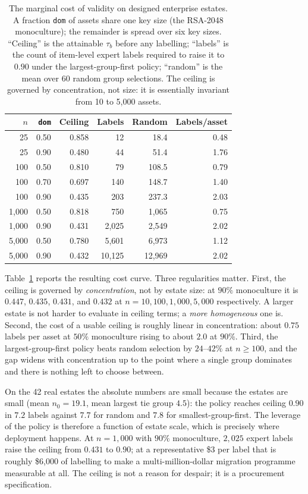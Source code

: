 \documentclass[conference,10pt]{IEEEtran}
\newcommand{\tb}{\tau_b}
\newcommand{\nzero}{n_0}
\begin{document}
\begin{table}[t]
\centering
\caption{The marginal cost of validity on designed enterprise estates. A fraction
\texttt{dom} of assets share one key size (the RSA-2048 monoculture); the remainder is spread over
six key sizes. ``Ceiling'' is the attainable $\tb$ before any labelling; ``labels'' is the count
of item-level expert labels required to raise it to $0.90$ under the largest-group-first policy;
``random'' is the mean over 60 random group selections. The ceiling is governed by concentration,
not size: it is essentially invariant from 10 to 5{,}000 assets.}
\label{tab:labelling}
\small
\begin{tabular}{rrrrrr}
\toprule
$n$ & \texttt{dom} & Ceiling & Labels & Random & Labels/asset \\
\midrule
25  & 0.50 & 0.858 & 12    & 18.4  & 0.48 \\
25  & 0.90 & 0.480 & 44    & 51.4  & 1.76 \\
100 & 0.50 & 0.810 & 79    & 108.5 & 0.79 \\
100 & 0.70 & 0.697 & 140   & 148.7 & 1.40 \\
100 & 0.90 & 0.435 & 203   & 237.3 & 2.03 \\
1{,}000 & 0.50 & 0.818 & 750   & 1{,}065 & 0.75 \\
1{,}000 & 0.90 & 0.431 & 2{,}025 & 2{,}549 & 2.02 \\
5{,}000 & 0.50 & 0.780 & 5{,}601 & 6{,}973 & 1.12 \\
5{,}000 & 0.90 & 0.432 & 10{,}125 & 12{,}969 & 2.02 \\
\bottomrule
\end{tabular}
\end{table}

Table~\ref{tab:labelling} reports the resulting cost curve. Three regularities matter. First, the
ceiling is governed by \emph{concentration}, not by estate size: at $90\%$ monoculture it is
$0.447$, $0.435$, $0.431$, and $0.432$ at $n = 10, 100, 1{,}000, 5{,}000$ respectively. A larger
estate is not harder to evaluate in ceiling terms; a \emph{more homogeneous} one is. Second, the
cost of a usable ceiling is roughly linear in concentration: about $0.75$ labels per asset at
$50\%$ monoculture rising to about $2.0$ at $90\%$. Third, the largest-group-first policy beats
random selection by $24$--$42\%$ at $n \ge 100$, and the gap widens with concentration up to the
point where a single group dominates and there is nothing left to choose between.

On the 42 real estates the absolute numbers are small because the estates are small (mean
$\nzero = 19.1$, mean largest tie group $4.5$): the policy reaches ceiling $0.90$ in $7.2$ labels
against $7.7$ for random and $7.8$ for smallest-group-first. The leverage of the policy is
therefore a function of estate scale, which is precisely where deployment happens. At $n=1{,}000$
with $90\%$ monoculture, $2{,}025$ expert labels raise the ceiling from $0.431$ to $0.90$; at a
representative \$3 per label that is roughly \$6{,}000 of labelling to make a multi-million-dollar
migration programme measurable at all. The ceiling is not a reason for despair; it is a
procurement specification.
\end{document}
